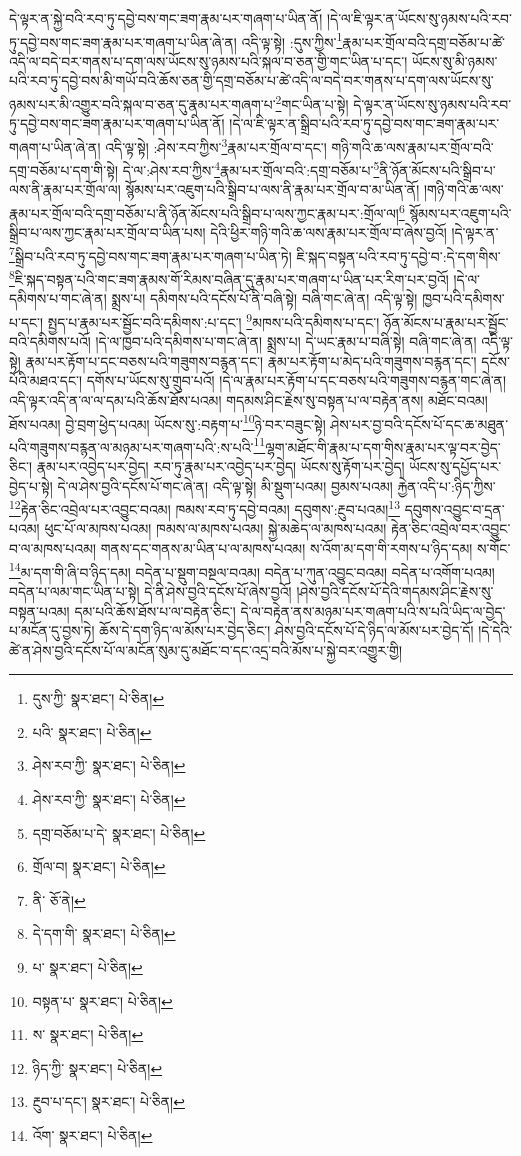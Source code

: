 དེ་ལྟར་ན་སྐྱེ་བའི་རབ་ཏུ་དབྱེ་བས་གང་ཟག་རྣམ་པར་གཞག་པ་ཡིན་ནོ། །དེ་ལ་ཇི་ལྟར་ན་ཡོངས་སུ་ཉམས་པའི་རབ་ཏུ་དབྱེ་བས་གང་ཟག་རྣམ་པར་གཞག་པ་ཡིན་ཞེ་ན། འདི་ལྟ་སྟེ། :དུས་ཀྱིས་\footnote{དུས་ཀྱི་  སྣར་ཐང་།  པེ་ཅིན། }རྣམ་པར་གྲོལ་བའི་དགྲ་བཅོམ་པ་ཚེ་འདི་ལ་བདེ་བར་གནས་པ་དག་ལས་ཡོངས་སུ་ཉམས་པའི་སྐལ་བ་ཅན་གྱི་གང་ཡིན་པ་དང་། ཡོངས་སུ་མི་ཉམས་པའི་རབ་ཏུ་དབྱེ་བས་མི་གཡོ་བའི་ཆོས་ཅན་གྱི་དགྲ་བཅོམ་པ་ཚེ་འདི་ལ་བདེ་བར་གནས་པ་དག་ལས་ཡོངས་སུ་ཉམས་པར་མི་འགྱུར་བའི་སྐལ་བ་ཅན་དུ་རྣམ་པར་གཞག་པ་\footnote{པའི་  སྣར་ཐང་།  པེ་ཅིན། }གང་ཡིན་པ་སྟེ། དེ་ལྟར་ན་ཡོངས་སུ་ཉམས་པའི་རབ་ཏུ་དབྱེ་བས་གང་ཟག་རྣམ་པར་གཞག་པ་ཡིན་ནོ། །དེ་ལ་ཇི་ལྟར་ན་སྒྲིབ་པའི་རབ་ཏུ་དབྱེ་བས་གང་ཟག་རྣམ་པར་གཞག་པ་ཡིན་ཞེ་ན། འདི་ལྟ་སྟེ། :ཤེས་རབ་ཀྱིས་\footnote{ཤེས་རབ་ཀྱི་  སྣར་ཐང་།  པེ་ཅིན། }རྣམ་པར་གྲོལ་བ་དང་། གཉི་གའི་ཆ་ལས་རྣམ་པར་གྲོལ་བའི་དགྲ་བཅོམ་པ་དག་གི་སྟེ། དེ་ལ་:ཤེས་རབ་ཀྱིས་\footnote{ཤེས་རབ་ཀྱི་  སྣར་ཐང་།  པེ་ཅིན། }རྣམ་པར་གྲོལ་བའི་:དགྲ་བཅོམ་པ་\footnote{དགྲ་བཅོམ་པ་དེ་  སྣར་ཐང་།  པེ་ཅིན། }ནི་ཉོན་མོངས་པའི་སྒྲིབ་པ་ལས་ནི་རྣམ་པར་གྲོལ་ལ། སྙོམས་པར་འཇུག་པའི་སྒྲིབ་པ་ལས་ནི་རྣམ་པར་གྲོལ་བ་མ་ཡིན་ནོ། །གཉི་གའི་ཆ་ལས་རྣམ་པར་གྲོལ་བའི་དགྲ་བཅོམ་པ་ནི་ཉོན་མོངས་པའི་སྒྲིབ་པ་ལས་ཀྱང་རྣམ་པར་:གྲོལ་ལ།\footnote{གྲོལ་བ།  སྣར་ཐང་།  པེ་ཅིན། } སྙོམས་པར་འཇུག་པའི་སྒྲིབ་པ་ལས་ཀྱང་རྣམ་པར་གྲོལ་བ་ཡིན་པས། དེའི་ཕྱིར་གཉི་གའི་ཆ་ལས་རྣམ་པར་གྲོལ་བ་ཞེས་བྱའོ། །དེ་ལྟར་ན་\footnote{ནི་  ཅོ་ནེ། }སྒྲིབ་པའི་རབ་ཏུ་དབྱེ་བས་གང་ཟག་རྣམ་པར་གཞག་པ་ཡིན་ཏེ། ཇི་སྐད་བསྟན་པའི་རབ་ཏུ་དབྱེ་བ་:དེ་དག་གིས་\footnote{དེ་དག་གི་  སྣར་ཐང་།  པེ་ཅིན། }ཇི་སྐད་བསྟན་པའི་གང་ཟག་རྣམས་གོ་རིམས་བཞིན་དུ་རྣམ་པར་གཞག་པ་ཡིན་པར་རིག་པར་བྱའོ། །དེ་ལ་དམིགས་པ་གང་ཞེ་ན། སྨྲས་པ། དམིགས་པའི་དངོས་པོ་ནི་བཞི་སྟེ། བཞི་གང་ཞེ་ན། འདི་ལྟ་སྟེ། ཁྱབ་པའི་དམིགས་པ་དང་། སྤྱད་པ་རྣམ་པར་སྦྱོང་བའི་དམིགས་:པ་དང་། \footnote{པ་  སྣར་ཐང་།  པེ་ཅིན། }མཁས་པའི་དམིགས་པ་དང་། ཉོན་མོངས་པ་རྣམ་པར་སྦྱོང་བའི་དམིགས་པའོ། །དེ་ལ་ཁྱབ་པའི་དམིགས་པ་གང་ཞེ་ན། སྨྲས་པ། དེ་ཡང་རྣམ་པ་བཞི་སྟེ། བཞི་གང་ཞེ་ན། འདི་ལྟ་སྟེ། རྣམ་པར་རྟོག་པ་དང་བཅས་པའི་གཟུགས་བརྙན་དང་། རྣམ་པར་རྟོག་པ་མེད་པའི་གཟུགས་བརྙན་དང་། དངོས་པོའི་མཐའ་དང་། དགོས་པ་ཡོངས་སུ་གྲུབ་པའོ། །དེ་ལ་རྣམ་པར་རྟོག་པ་དང་བཅས་པའི་གཟུགས་བརྙན་གང་ཞེ་ན། འདི་ལྟར་འདི་ན་ལ་ལ་དམ་པའི་ཆོས་ཐོས་པའམ། གདམས་ཤིང་རྗེས་སུ་བསྟན་པ་ལ་བརྟེན་ནས། མཐོང་བའམ། ཐོས་པའམ། བྱེ་བྲག་ཕྱེད་པའམ། ཡོངས་སུ་:བརྟག་པ་\footnote{བསྟན་པ་  སྣར་ཐང་།  པེ་ཅིན། }ཉེ་བར་བཟུང་སྟེ། ཤེས་པར་བྱ་བའི་དངོས་པོ་དང་ཆ་མཐུན་པའི་གཟུགས་བརྙན་ལ་མཉམ་པར་གཞག་པའི་:ས་པའི་\footnote{ས་  སྣར་ཐང་།  པེ་ཅིན། }ལྷག་མཐོང་གི་རྣམ་པ་དག་གིས་རྣམ་པར་ལྟ་བར་བྱེད་ཅིང་། རྣམ་པར་འབྱེད་པར་བྱེད། རབ་ཏུ་རྣམ་པར་འབྱེད་པར་བྱེད། ཡོངས་སུ་རྟོག་པར་བྱེད། ཡོངས་སུ་དཔྱོད་པར་བྱེད་པ་སྟེ། དེ་ལ་ཤེས་བྱའི་དངོས་པོ་གང་ཞེ་ན། འདི་ལྟ་སྟེ། མི་སྡུག་པའམ། བྱམས་པའམ། རྐྱེན་འདི་པ་:ཉིད་ཀྱིས་\footnote{ཉིད་ཀྱི་  སྣར་ཐང་།  པེ་ཅིན། }རྟེན་ཅིང་འབྲེལ་པར་འབྱུང་བའམ། ཁམས་རབ་ཏུ་དབྱེ་བའམ། དབུགས་:རྔུབ་པའམ།\footnote{རྔུབ་པ་དང་།  སྣར་ཐང་།  པེ་ཅིན། } དབུགས་འབྱུང་བ་དྲན་པའམ། ཕུང་པོ་ལ་མཁས་པའམ། ཁམས་ལ་མཁས་པའམ། སྐྱེ་མཆེད་ལ་མཁས་པའམ། རྟེན་ཅིང་འབྲེལ་བར་འབྱུང་བ་ལ་མཁས་པའམ། གནས་དང་གནས་མ་ཡིན་པ་ལ་མཁས་པའམ། ས་འོག་མ་དག་གི་རགས་པ་ཉིད་དམ། ས་གོང་\footnote{འོག་  སྣར་ཐང་།  པེ་ཅིན། }མ་དག་གི་ཞི་བ་ཉིད་དམ། བདེན་པ་སྡུག་བསྔལ་བའམ། བདེན་པ་ཀུན་འབྱུང་བའམ། བདེན་པ་འགོག་པའམ། བདེན་པ་ལམ་གང་ཡིན་པ་སྟེ། དེ་ནི་ཤེས་བྱའི་དངོས་པོ་ཞེས་བྱའོ། །ཤེས་བྱའི་དངོས་པོ་དེའི་གདམས་ཤིང་རྗེས་སུ་བསྟན་པའམ། དམ་པའི་ཆོས་ཐོས་པ་ལ་བརྟེན་ཅིང་། དེ་ལ་བརྟེན་ནས་མཉམ་པར་གཞག་པའི་ས་པའི་ཡིད་ལ་བྱེད་པ་མངོན་དུ་བྱས་ཏེ། ཆོས་དེ་དག་ཉིད་ལ་མོས་པར་བྱེད་ཅིང་། ཤེས་བྱའི་དངོས་པོ་དེ་ཉིད་ལ་མོས་པར་བྱེད་དོ། །དེ་དེའི་ཚེ་ན་ཤེས་བྱའི་དངོས་པོ་ལ་མངོན་སུམ་དུ་མཐོང་བ་དང་འདྲ་བའི་མོས་པ་སྐྱེ་བར་འགྱུར་གྱི། 